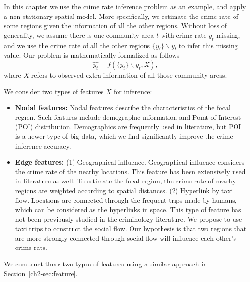 In this chapter we use the crime rate inference problem as an example, and apply a non-stationary spatial model. More specifically, we estimate the crime rate of some regions given the information of all the other regions. Without loss of generality, we assume there is one community area $t$ with crime rate $y_t$ missing, and we use the crime rate of all the other regions $\{y_i \} \backslash y_t$ to infer this missing value. Our problem is mathematically formalized as follows
\begin{equation}
\hat{y_t} = f( \{y_i\} \backslash y_t, X),
\end{equation}
where  $X$ refers to observed extra information of  all those community areas.




\smallskip
We consider two types of features $X$ for inference:
\begin{itemize}[leftmargin=*]
\item {\bf Nodal features:} Nodal features describe the characteristics of the focal region. Such features include demographic information and Point-of-Interest (POI) distribution. Demographics are frequently used in literature, but POI is a newer type of big data, which we find significantly improve the crime inference accuracy.
\item {\bf Edge features:} (1) Geographical influence. Geographical influence considers the crime rate of the nearby locations.  This feature has been extensively used in literature as well. To estimate the focal region, the crime rate of nearby regions are weighted according to spatial distances. (2) Hyperlink by taxi flow. Locations are connected through the frequent trips made by humans, which can be considered as the hyperlinks in space. This type of feature has not been previously studied in the criminology literature. We propose to use taxi trips to construct the social flow. Our hypothesis is that two regions that are more strongly connected through social flow will influence each other's crime rate.
\end{itemize}

We construct these two types of features using a similar approach in Section~\ref{ch2-sec:feature}.


